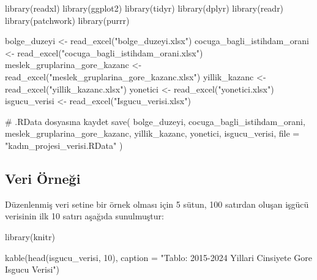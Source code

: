 \documentclass[
  11pt,
  a4paper,
  DIV=11,
  numbers=noendperiod]{scrartcl}
\newenvironment{Shaded}{\begin{snugshade}}{\end{snugshade}}
\newcommand{\AttributeTok}[1]{\textcolor[rgb]{0.40,0.45,0.13}{#1}}
\newcommand{\CommentTok}[1]{\textcolor[rgb]{0.37,0.37,0.37}{#1}}
\newcommand{\DecValTok}[1]{\textcolor[rgb]{0.68,0.00,0.00}{#1}}
\newcommand{\FunctionTok}[1]{\textcolor[rgb]{0.28,0.35,0.67}{#1}}
\newcommand{\NormalTok}[1]{\textcolor[rgb]{0.00,0.23,0.31}{#1}}
\newcommand{\OtherTok}[1]{\textcolor[rgb]{0.00,0.23,0.31}{#1}}
\newcommand{\StringTok}[1]{\textcolor[rgb]{0.13,0.47,0.30}{#1}}
\begin{document}
\begin{Shaded}
\begin{Highlighting}[]
\FunctionTok{library}\NormalTok{(readxl)}
\FunctionTok{library}\NormalTok{(ggplot2)}
\FunctionTok{library}\NormalTok{(tidyr)}
\FunctionTok{library}\NormalTok{(dplyr)}
\FunctionTok{library}\NormalTok{(readr)}
\FunctionTok{library}\NormalTok{(patchwork)}
\FunctionTok{library}\NormalTok{(purrr)}

\NormalTok{bolge\_duzeyi }\OtherTok{\textless{}{-}} \FunctionTok{read\_excel}\NormalTok{(}\StringTok{"bolge\_duzeyi.xlsx"}\NormalTok{)}
\NormalTok{cocuga\_bagli\_istihdam\_orani }\OtherTok{\textless{}{-}} \FunctionTok{read\_excel}\NormalTok{(}\StringTok{"cocuga\_bagli\_istihdam\_orani.xlsx"}\NormalTok{)}
\NormalTok{meslek\_gruplarina\_gore\_kazanc }\OtherTok{\textless{}{-}} \FunctionTok{read\_excel}\NormalTok{(}\StringTok{"meslek\_gruplarina\_gore\_kazanc.xlsx"}\NormalTok{)}
\NormalTok{yillik\_kazanc }\OtherTok{\textless{}{-}} \FunctionTok{read\_excel}\NormalTok{(}\StringTok{"yillik\_kazanc.xlsx"}\NormalTok{)}
\NormalTok{yonetici }\OtherTok{\textless{}{-}} \FunctionTok{read\_excel}\NormalTok{(}\StringTok{"yonetici.xlsx"}\NormalTok{)}
\NormalTok{isgucu\_verisi }\OtherTok{\textless{}{-}} \FunctionTok{read\_excel}\NormalTok{(}\StringTok{"Isgucu\_verisi.xlsx"}\NormalTok{)}

\CommentTok{\# .RData dosyasına kaydet}
\FunctionTok{save}\NormalTok{(}
\NormalTok{  bolge\_duzeyi,}
\NormalTok{  cocuga\_bagli\_istihdam\_orani,}
\NormalTok{  meslek\_gruplarina\_gore\_kazanc,}
\NormalTok{  yillik\_kazanc,}
\NormalTok{  yonetici,}
\NormalTok{  isgucu\_verisi,}
  \AttributeTok{file =} \StringTok{"kadın\_projesi\_verisi.RData"}
\NormalTok{)}
\end{Highlighting}
\end{Shaded}

\subsection{Veri Örneği}\label{veri-uxf6rneux11fi}

Düzenlenmiş veri setine bir örnek olması için 5 sütun, 100 satırdan
oluşan işgücü verisinin ilk 10 satırı aşağıda sunulmuştur:

\begin{Shaded}
\begin{Highlighting}[]
\FunctionTok{library}\NormalTok{(knitr)}

\FunctionTok{kable}\NormalTok{(}\FunctionTok{head}\NormalTok{(isgucu\_verisi, }\DecValTok{10}\NormalTok{), }\AttributeTok{caption =} \StringTok{"Tablo: 2015{-}2024 Yillari Cinsiyete Gore Isgucu Verisi"}\NormalTok{)}
\end{Highlighting}
\end{Shaded}
\end{document}
